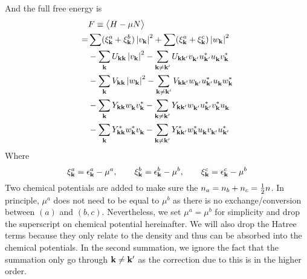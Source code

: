 And the full free energy is 
\begin{equation}\label{eq:uvw:F}
 \begin{split}
  &F\equiv\bigl<{H-\mu{}N}\bigr>\\
    =&\sum(\xi^a_{\mathbf{k}}+\xi^b_{\mathbf{k}})\left\lvert{v_{\ensuremath{\mathbf{k}}}}\right\rvert^2+\sum(\xi^a_{\mathbf{k}}+\xi^c_{\mathbf{k}})\left\lvert{w_{\ensuremath{\mathbf{k}}}}\right\rvert^2\\
    &-\sum_{\mathbf{k}}U_{\mathbf{k}\mathbf{k}}\left\lvert{v_{\ensuremath{\mathbf{k}}}}\right\rvert^2-\sum_{\mathbf{k}\neq\mathbf{k}'}U_{\mathbf{k}\mathbf{k}'}v^{}_{\mathbf{k}'}u^*_{\mathbf{k}'}u^{}_{\mathbf{k}}{}v^*_{\mathbf{k}}\\
    &-\sum_{\mathbf{k}}V_{\mathbf{k}\mathbf{k}}\left\lvert{w_{\ensuremath{\mathbf{k}}}}\right\rvert^2
      -\sum_{\mathbf{k}\neq\mathbf{k}'}V_{\mathbf{k}\mathbf{k}'}w^{}_{\mathbf{k}'}u^*_{\mathbf{k}'}u^{}_{\mathbf{k}}{}w^*_{\mathbf{k}}\\
    &-\sum_{\mathbf{k}}Y_{\mathbf{k}\mathbf{k}}w^{}_{\mathbf{k}}v^*_{\mathbf{k}}{}
      -\sum_{\mathbf{k}\neq\mathbf{k}'}Y_{\mathbf{k}\mathbf{k}'}w^{}_{\mathbf{k}'}{u^{*}_{\mathbf{k}'}}v^*_{\mathbf{k}}{}u^{}_{\mathbf{k}}\\
    &-\sum_{\mathbf{k}}Y^*_{\mathbf{k}\mathbf{k}}w^*_{\mathbf{k}}v^{}_{\mathbf{k}}{}
      -\sum_{\mathbf{k}\neq\mathbf{k}'}Y^*_{\mathbf{k}\mathbf{k}'}w^*_{\mathbf{k}}{u^{}_{\mathbf{k}}}v^{}_{\mathbf{k}'}{}u^{*}_{\mathbf{k}'}
 \end{split}
\end{equation}
Where 
\begin{equation*}
 \xi^a_{\mathbf{k}}=\epsilon^a_{\mathbf{k}}-\mu^a,\qquad\xi^b_{\mathbf{k}}=\epsilon^b_{\mathbf{k}}-\mu^b,\qquad\xi^c_{\mathbf{k}}=\epsilon^c_{\mathbf{k}}-\mu^b
\end{equation*}
Two chemical potentials are added to make sure the $n_a=n_b+n_c=\frac{1}{2}n$.  In principle, $\mu^{a}$ does not need to be equal to $\mu^{b}$  as there is no exchange/conversion between $(a)$ and $(b,c)$.  Nevertheless, we  set $\mu^{a}=\mu^{b}$ for simplicity and drop the superscript on chemical potential hereinafter. 
We will also drop the Hatree terms because they  only relate to the density and thus can be absorbed into the chemical potentials.   In the second summation, we ignore the fact that the summation only go through $\mathbf{k}\neq\mathbf{k}'$ as the correction due to this is in the higher order. 
 
